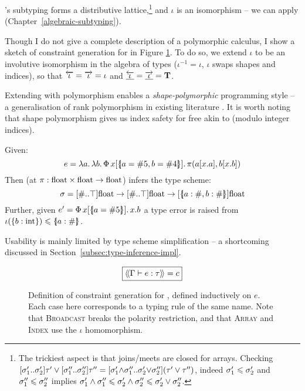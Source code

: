 \starr{}'s subtyping forms a distributive lattice,\footnote{The trickiest aspect is that joins/meets are closed for arrays. Checking $\sarraytype{\sigma_1'}{\sigma_2'}{\tau'} \join \sarraytype{\sigma_1''}{\sigma_2''}{\tau''} = \sarraytype{\sigma_1' {\meet} \sigma_1''}{\sigma_2' {\join} \sigma_2''}{(\tau' \join \tau'')}$, indeed $\sigma_1' \leqslant \sigma_2'$ and $\sigma_1'' \leqslant \sigma_2''$ implies $\sigma_1' \land \sigma_1'' \leqslant \sigma_2' \land \sigma_2'' \leqslant \sigma_2' \lor \sigma_2''$.} and $\iota$ is an isomorphism -- we can apply \inference{} (Chapter~\ref{algebraic-subtyping}). 

Though I do not give a complete description of a polymorphic \starr{} calculus, I show a sketch of constraint generation for \starr{} in Figure \ref{fig:star-type-constraints}. To do so, we extend $\iota$ to be an involutive isomorphism in the algebra of types ($\iota^{-1} = \iota$, \ie{} $\iota$ swaps shapes and indices), so that $\overleftarrow{\iota} = \overrightarrow{\iota} = \iota$ and $\underline{\overleftarrow{\iota}} = \underline{\overrightarrow{\iota}} = \mathbf T$.

Extending \starr{} with polymorphism enables a \emph{shape-polymorphic} programming style -- a generalisation of rank polymorphism in existing literature \cite{automap, sac-tensor-comprehensions}. 
It is worth noting that shape polymorphism gives us index safety for free akin to \textcite{theorems-for-free} (modulo integer indices).

\begin{example}
Given:
$$ e = \fllam a \fllam b \sbuild{x}{\sproductval{a = \ssize 5, b = \ssize 4}}{\pi(a[x{.}a], b[x{.}b])} $$
Then \inference{} (at $\pi : \mathrm{float} \times \mathrm{float} \to \mathrm{float}$) infers the type scheme:
$$ \sigma = \sarraytype{\ssized}{\top}{\sfloat} \to \sarraytype{\ssized}{\top}{\sfloat} \to \suniarraytype{\sproducttype{a : \ssized, b : \ssized}}{\sfloat} $$
Further, given $e' = \sbuild{x}{\sproductval{a = \ssize 5}}{x.{b}}$
a type error is raised from $\iota(\srecordtype{b : \sint}) \sub \sproducttype{a : \ssized}$. 

Usability is mainly limited by type scheme simplification -- a shortcoming discussed in Section~\ref{subsec:type-inference-impl}. 
\end{example}

\begin{figure}
    \centering
    \addtolength{\jot}{0.2em}
    $$ \boxed{\cstr{\Gamma}{e}{\tau} = c} $$
    
    \caption{Definition of \inference{} constraint generation for \starr{}, defined inductively on $e$. Each case here corresponds to a typing rule of the same name. Note that \textsc{Broadcast} breaks the polarity restriction, and that \textsc{Array} and \textsc{Index} use the $\iota$ homomorphism.}
    \label{fig:star-type-constraints}
\end{figure}

